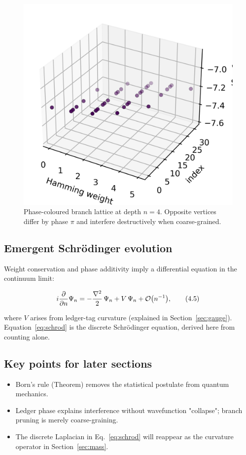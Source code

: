 \begin{figure}[t]
  \centering
  \includegraphics[width=\linewidth]{figs/branch_lattice.png}
  \caption{Phase-coloured branch lattice at depth
           $n=4$.  Opposite vertices differ by phase $\pi$ and interfere
           destructively when coarse-grained.}
  \label{fig:branch-lattice}
\end{figure}

\subsection{Emergent Schrödinger evolution}

Weight conservation and phase additivity imply a differential equation
in the continuum limit:

\[
  i\frac{\partial}{\partial n}\Psi_n
  =-\frac{\nabla^2}{2}\,\Psi_n + V\,\Psi_n + \order{n^{-1}},
\tag{4.5}\label{eq:schrod}
\]

where $V$ arises from ledger-tag curvature (explained in
Section~\ref{sec:gauge}).  Equation~\eqref{eq:schrod} is the discrete
Schrödinger equation, derived here from counting alone.

\subsection{Key points for later sections}

\begin{itemize}
  \item Born's rule (Theorem) removes the statistical postulate from
        quantum mechanics.
  \item Ledger phase explains interference without wavefunction
        "collapse"; branch pruning is merely coarse-graining.
  \item The discrete Laplacian in Eq.~\eqref{eq:schrod} will reappear
        as the curvature operator in Section~\ref{sec:mass}.
\end{itemize}

\clearpage
